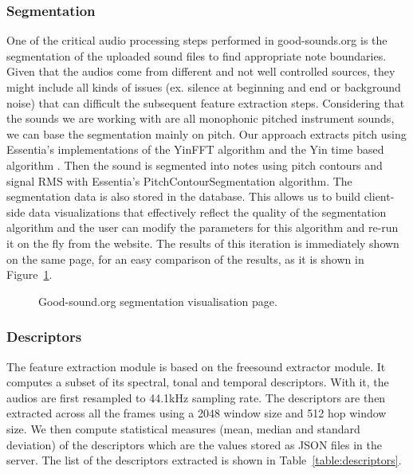 \documentclass{article}
\begin{document}
\subsubsection{Segmentation}
One of the critical audio processing steps performed in good-sounds.org is the segmentation of the uploaded sound files to find appropriate note boundaries. Given that the audios come from different and not well controlled sources, they might include all kinds of issues (ex. silence at beginning and end or background noise) that can difficult the subsequent feature extraction steps. Considering that the sounds we are working with are all monophonic pitched instrument sounds, we can base the segmentation mainly on pitch. Our approach extracts pitch using Essentia’s \cite{03} implementations of the YinFFT algorithm \cite{07} and the Yin time based algorithm \cite{05}. Then the sound is segmented into notes using pitch contours \cite{06} and signal RMS with Essentia’s PitchContourSegmentation algorithm.  
The segmentation data is also stored in the database. This allows us to build client-side data visualizations that effectively reflect the quality of the segmentation algorithm and the user can modify the parameters for this algorithm and re-run it on the fly from the website. The results of this ite\-ration is immediately shown on the same page, for an easy comparison of the results, as it is shown in Figure~\ref{fig:segmentation}.

\begin{figure}[ht]
 \centerline{}
 \caption{Good-sound.org segmentation visualisation page.}
 \label{fig:segmentation}
\end{figure}

\subsubsection{Descriptors}
The feature extraction module is based on the freesound extractor module. It computes a subset of its spectral, tonal and temporal descriptors. With it, the audios are first resampled to 44.1kHz sampling rate. The descriptors are then extracted across all the frames using a 2048 window size and 512 hop window size. We then compute statistical measures (mean, median and standard deviation) of the descriptors which are the values stored as JSON files in the server. The list of the descriptors extracted is shown in Table~\ref{table:descriptors}. 
\end{document}
